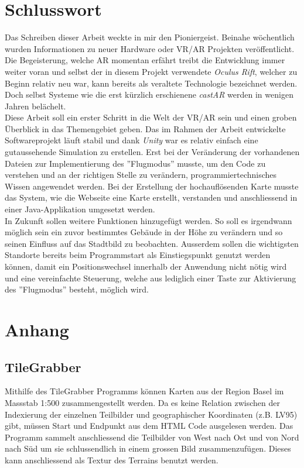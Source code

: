 \chapter{Schlusswort}\label{c.zusammenfassung}
\vspace{-20pt}
Das Schreiben dieser Arbeit weckte in mir den Pioniergeist. Beinahe wöchentlich wurden Informationen zu neuer Hardware oder VR/AR Projekten veröffentlicht. Die Begeisterung, welche AR momentan erfährt treibt die Entwicklung immer weiter voran und selbst der in diesem Projekt verwendete \textit{Oculus Rift}, welcher zu Beginn relativ neu war, kann bereits als veraltete Technologie bezeichnet werden. Doch selbst Systeme wie die erst kürzlich erschienene \textit{castAR} werden in wenigen Jahren belächelt.\\[6pt] 
Diese Arbeit soll ein erster Schritt in die Welt der VR/AR sein und einen groben Überblick in das Themengebiet geben. Das im Rahmen der Arbeit entwickelte Softwareprojekt läuft stabil und dank \textit{Unity} war es relativ einfach eine gutaussehende Simulation zu erstellen. Erst bei der Veränderung der vorhandenen Dateien zur Implementierung des ''Flugmodus'' musste, um den Code zu verstehen und an der richtigen Stelle zu verändern, programmiertechnisches Wissen angewendet werden. Bei der Erstellung der hochauflösenden Karte musste das System, wie die Webseite eine Karte erstellt, verstanden und anschliessend in einer Java-Applikation umgesetzt werden.\\[6pt]
 In Zukunft sollen weitere Funktionen hinzugefügt werden. So soll es irgendwann möglich sein ein zuvor bestimmtes Gebäude in der Höhe zu verändern und so seinen Einfluss auf das Stadtbild zu beobachten. Ausserdem sollen die wichtigsten Standorte bereits beim Programmstart als Einstiegspunkt genutzt werden können, damit ein Positionswechsel innerhalb der Anwendung nicht nötig wird und eine vereinfachte Steuerung, welche aus lediglich einer Taste zur Aktivierung des ''Flugmodus'' besteht, möglich wird.
\chapter{Anhang}\label{c.anhang}
\vspace{-20pt}
\section{TileGrabber}\label{s.tilegrabber}
Mithilfe des TileGrabber Programms können Karten aus der Region Basel im Massstab 1:500 zusammengestellt werden. Da es keine Relation zwischen der Indexierung der einzelnen Teilbilder und geographischer Koordinaten (z.B. LV95) gibt, müssen Start und Endpunkt aus dem HTML Code ausgelesen werden. Das Programm sammelt anschliessend die Teilbilder von West nach Ost und von Nord nach Süd um sie schlussendlich in einem grossen Bild zusammenzufügen. Dieses kann anschliessend als Textur des Terrains benutzt werden.

